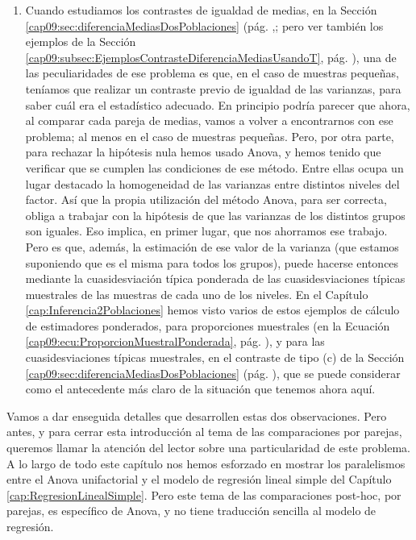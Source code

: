 \begin{enumerate}
  \item Cuando estudiamos los contrastes de igualdad de medias, en la Sección \ref{cap09:sec:diferenciaMediasDosPoblaciones} (pág. \pageref{cap09:sec:diferenciaMediasDosPoblaciones},; pero ver también los ejemplos de la Sección \ref{cap09:subsec:EjemplosContrasteDiferenciaMediasUsandoT}, pág. \pageref{cap09:subsec:EjemplosContrasteDiferenciaMediasUsandoT}), una de las peculiaridades de ese problema es que, en el caso de muestras pequeñas, teníamos que realizar un contraste previo de igualdad de las varianzas, para saber cuál era el estadístico adecuado. En principio podría parecer que ahora, al comparar cada pareja de medias, vamos a volver a encontrarnos con ese problema; al menos en el caso de muestras pequeñas. Pero, por otra parte, para rechazar la hipótesis nula hemos usado Anova, y hemos tenido que verificar que se cumplen las condiciones de ese método. Entre ellas ocupa un lugar destacado la homogeneidad de las varianzas entre distintos niveles del factor. Así que la propia utilización del método Anova, para ser correcta, obliga a trabajar con la hipótesis de que las varianzas de los distintos grupos son iguales. Eso implica, en primer lugar, que nos ahorramos ese trabajo. Pero es que, además, la estimación de ese valor de la varianza (que estamos suponiendo que es el misma para todos los grupos), puede hacerse entonces mediante la {\sf cuasidesviación típica ponderada} de las cuasidesviaciones típicas muestrales de las muestras de cada uno de los niveles. En el Capítulo \ref{cap:Inferencia2Poblaciones} hemos visto varios de estos ejemplos de cálculo de estimadores ponderados, para proporciones muestrales (en la Ecuación \ref{cap09:ecu:ProporcionMuestralPonderada}, pág. \pageref{cap09:ecu:ProporcionMuestralPonderada}), y para las cuasidesviaciones típicas muestrales, en el contraste de tipo (c) de la Sección \ref{cap09:sec:diferenciaMediasDosPoblaciones} (pág. \pageref{cap09:sec:diferenciaMediasDosPoblaciones}), que se puede considerar como el antecedente más claro de la situación que tenemos ahora aquí.
\end{enumerate}

Vamos a dar enseguida detalles que desarrollen estas dos observaciones. Pero antes, y para cerrar esta introducción al tema de las comparaciones  por parejas, queremos llamar la atención del lector sobre una particularidad de este problema. A lo largo de todo este capítulo nos hemos esforzado en mostrar los paralelismos entre el Anova unifactorial y el modelo de regresión lineal simple del Capítulo \ref{cap:RegresionLinealSimple}. Pero este tema de las comparaciones post-hoc, por parejas, es específico de Anova, y no tiene traducción sencilla al modelo de regresión.

